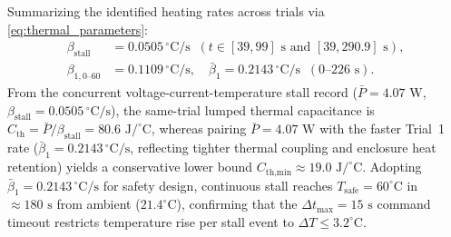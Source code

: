 \documentclass[lettersize,journal]{IEEEtran}
\begin{document}
	Summarizing the identified heating rates across trials via \eqref{eq:thermal_parameters}:
	\begin{align}
		\beta_{\text{stall}} &= 0.0505\,^\circ\text{C/s} \;\; (t \in [39, 99]\text{ s and } [39, 290.9]\text{ s}), \nonumber \\
		\beta_{1,0\text{--}60} &= 0.1109\,^\circ\text{C/s}, \quad \bar{\beta}_1 = 0.2143\,^\circ\text{C/s} \;\; (0\text{--}226\text{ s}).
		\label{eq:heating_rate}
	\end{align}
	From the concurrent voltage-current-temperature stall record ($\bar{P} = 4.07\text{ W}$, $\beta_{\text{stall}} = 0.0505\,^\circ\text{C/s}$), the same-trial lumped thermal capacitance is $C_{\text{th}} = \bar{P}/\beta_{\text{stall}} = 80.6\text{ J/}^\circ\text{C}$, whereas pairing $\bar{P} = 4.07\text{ W}$ with the faster Trial~1 rate ($\bar{\beta}_1 = 0.2143\,^\circ\text{C/s}$, reflecting tighter thermal coupling and enclosure heat retention) yields a conservative lower bound $C_{\text{th,min}} \approx 19.0\text{ J/}^\circ\text{C}$. Adopting $\bar{\beta}_1 = 0.2143\,^\circ\text{C/s}$ for safety design, continuous stall reaches $T_{\text{safe}} = 60^\circ\text{C}$ in $\approx 180\text{ s}$ from ambient ($21.4^\circ\text{C}$), confirming that the $\Delta t_{\max} = 15\text{ s}$ command timeout restricts temperature rise per stall event to $\Delta T \le 3.2^\circ\text{C}$.
	
\end{document}
